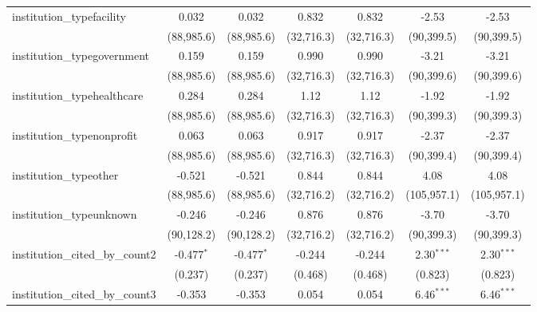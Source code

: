 \begin{tabular}{lcccccc}
   institution\_typefacility             & 0.032         & 0.032         & 0.832         & 0.832         & -2.53         & -2.53\\   
                                         & (88,985.6)    & (88,985.6)    & (32,716.3)    & (32,716.3)    & (90,399.5)    & (90,399.5)\\   
   institution\_typegovernment           & 0.159         & 0.159         & 0.990         & 0.990         & -3.21         & -3.21\\   
                                         & (88,985.6)    & (88,985.6)    & (32,716.3)    & (32,716.3)    & (90,399.6)    & (90,399.6)\\   
   institution\_typehealthcare           & 0.284         & 0.284         & 1.12          & 1.12          & -1.92         & -1.92\\   
                                         & (88,985.6)    & (88,985.6)    & (32,716.3)    & (32,716.3)    & (90,399.3)    & (90,399.3)\\   
   institution\_typenonprofit            & 0.063         & 0.063         & 0.917         & 0.917         & -2.37         & -2.37\\   
                                         & (88,985.6)    & (88,985.6)    & (32,716.3)    & (32,716.3)    & (90,399.4)    & (90,399.4)\\   
   institution\_typeother                & -0.521        & -0.521        & 0.844         & 0.844         & 4.08          & 4.08\\   
                                         & (88,985.6)    & (88,985.6)    & (32,716.2)    & (32,716.2)    & (105,957.1)   & (105,957.1)\\   
   institution\_typeunknown              & -0.246        & -0.246        & 0.876         & 0.876         & -3.70         & -3.70\\   
                                         & (90,128.2)    & (90,128.2)    & (32,716.2)    & (32,716.2)    & (90,399.3)    & (90,399.3)\\   
   institution\_cited\_by\_count2        & -0.477$^{*}$  & -0.477$^{*}$  & -0.244        & -0.244        & 2.30$^{***}$  & 2.30$^{***}$\\   
                                         & (0.237)       & (0.237)       & (0.468)       & (0.468)       & (0.823)       & (0.823)\\   
   institution\_cited\_by\_count3        & -0.353        & -0.353        & 0.054         & 0.054         & 6.46$^{***}$  & 6.46$^{***}$\\   

\end{tabular}
